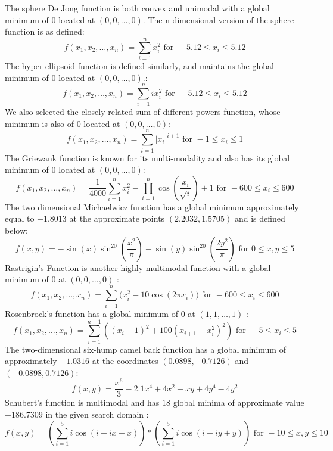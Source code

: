 %
%
The sphere De Jong function is both convex and unimodal with a global minimum of $0$ located at $(0,0,\ldots,0)$. The n-dimensional version of the sphere function is as defined\cite{molga05,yang10}:
\[ f(x_1,x_2,\ldots,x_n) = \sum\limits_{i=1}^n x_i^2 \text{ for } -5.12 \leq x_i \leq 5.12 \]
%
%
The hyper-ellipsoid function is defined similarly, and maintains the global minimum of $0$ located at $(0,0,\ldots,0)$.\cite{molga05,yang10}:
\[ f(x_1,x_2,\ldots,x_n) = \sum\limits_{i=1}^n ix_i^2 \text{ for } -5.12 \leq x_i \leq 5.12\]
%
%
We also selected the closely related sum of different powers function, whose minimum is also of $0$ located at $(0,0,\ldots,0)$\cite{molga05,yang10}:
\[ f(x_1,x_2,\ldots,x_n) = \sum\limits_{i=1}^n |x_i|^{i+1} \text{ for } -1 \leq x_i \leq 1\]
%
%
The Griewank function is known for its multi-modality and also has its global minimum of $0$ located at $(0,0,\ldots,0)$\cite{molga05,yang10}:
 \[ f(x_1,x_2,\ldots,x_n) = \frac{1}{4000}\sum\limits_{i=1}^n x_i^{2} - \prod\limits_{i=1}^{n} \cos(\frac{x_i}{\sqrt{i}})+1 \text{ for } -600 \leq x_i \leq 600\]
 The two dimensional Michaelwicz function has a global minimum approximately equal to $-1.8013$ at the approximate points $(2.2032,1.5705)$ and is defined below\cite{molga05,yang10}:
 \[ f(x,y) = -\sin(x)\sin^{20}(\frac{x^2}{\pi}) - \sin(y)\sin^{20}(\frac{2y^2}{\pi}) \text{ for } 0 \leq x,y \leq 5\]
 Rastrigin's Function is another highly multimodal function with a global minimum of $0$ at $(0,0,\ldots,0)$ \cite{molga05,yang10}:
 \[f(x_1,x_2,\ldots,x_n) = \sum\limits_{i=1}^n \big( x_i^2 - 10\cos(2\pi x_i) \big)\text{ for } -600 \leq x_i \leq 600\]
 Rosenbrock's function has a global minimum of 0 at $(1,1,\ldots,1)$ \cite{molga05,yang10}:
 \[f(x_1,x_2,\ldots,x_n) = \sum\limits_{i=1}^{n-1} ((x_i-1)^2 + 100(x_{i+1}-x_i^2)^2) \text{ for } -5 \leq x_i \leq 5\]
 The two-dimensional six-hump camel back function has a global minimum of approximately $-1.0316$ at the coordinates $(0.0898,-0.7126)$ and $(-0.0898,0.7126)$\cite{molga05,yang10}:
 \[f(x,y) = \frac{x^6}{3}-2.1x^4+4x^2+xy+4y^4-4y^2 \]
 Schubert's function is multimodal and has $18$ global minima of approximate value $-186.7309$ in the given search domain \cite{molga05,yang10}:
 \[ f(x,y) = (\sum\limits_{i=1}^{5} i\cos(i + ix + x)) * (\sum\limits_{i=1}^{5} i\cos(i + iy + y)) \text{ for } -10 \leq x,y \leq 10 \]
 
